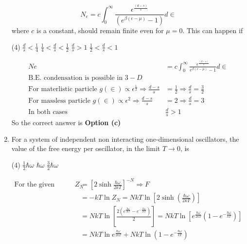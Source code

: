 \begin{enumerate}
	$$
	N_{e}=c \int_{0}^{\infty} \frac{\epsilon^{\frac{(d-s)}{s}}}{\left(e^{\beta(\epsilon-\mu)}-1\right)} d \in
	$$
	where $c$ is a constant, should remain finite even for $\mu=0$. This can happen if
	{}
	\begin{tasks}(4)
		\task[\textbf{a.}] $\frac{d}{s}<\frac{1}{4}$
		\task[\textbf{b.}] $\frac{1}{4}<\frac{d}{s}<\frac{1}{2}$
		\task[\textbf{c.}] $\frac{d}{s}>1$
		\task[\textbf{d.}] $\frac{1}{2}<\frac{d}{s}<1$
	\end{tasks}
\begin{answer}
	\begin{align*}
	N e&=c \int_{0}^{\infty} \frac{\epsilon^{\frac{(d-s)}{s}}}{e^{\beta(\epsilon-\mu)}-1} d \in\\
	\text{B.E. condensation is possible in $3-D$}\\
	\text{For materlistic particle }g(\in) \propto \epsilon^{\frac{1}{2}} \Rightarrow \frac{d-s}{s}&=\frac{1}{2} \Rightarrow \frac{d}{s}=\frac{3}{2}\\
	\text{For massless particle }g(\in) \propto \epsilon^{2} \Rightarrow \frac{d-s}{s}&=2 \Rightarrow \frac{d}{s}=3\\
	\text{In both cases }&\frac{d}{s}>1
	\end{align*}
	So the correct answer is \textbf{Option (c)}
\end{answer}
	\item For a system of independent non interacting one-dimensional oscillators, the value of the free energy per oscillator, in the limit $T \rightarrow 0$, is
	{}
	\begin{tasks}(4)
		\task[\textbf{a.}] $\frac{1}{2} \hbar \omega$
		\task[\textbf{b.}] $\hbar \omega$
		\task[\textbf{c.}] $\frac{3}{2} \hbar \omega$
	\end{tasks}
\begin{answer}
	\begin{align*}
	\text{For the given system }Z_{N}&=\left[2 \sinh \frac{\hbar \omega}{2 k T}\right]^{-N} \Rightarrow F\\&=-k T \ln Z_{N}=N k T \ln \left[2 \sinh \left(\frac{\hbar \omega}{2 k T}\right)\right]\\
	&=N k T \ln \left[\frac{2\left(e^{\frac{\hbar \omega}{2 k T}}-e^{-\frac{\hbar \omega}{2 k T}}\right)}{2}\right]=N k T \ln \left[e^{\frac{\hbar \omega}{2 k T}}\left(1-e^{-\frac{\hbar \omega}{k T}}\right)\right]\\&=N k T \ln e^{\frac{\hbar \omega}{2 k T}}+N k T \ln \left(1-e^{-\frac{\hbar \omega}{k T}}\right)\\

\end{align*}
\end{answer}
\end{enumerate}

